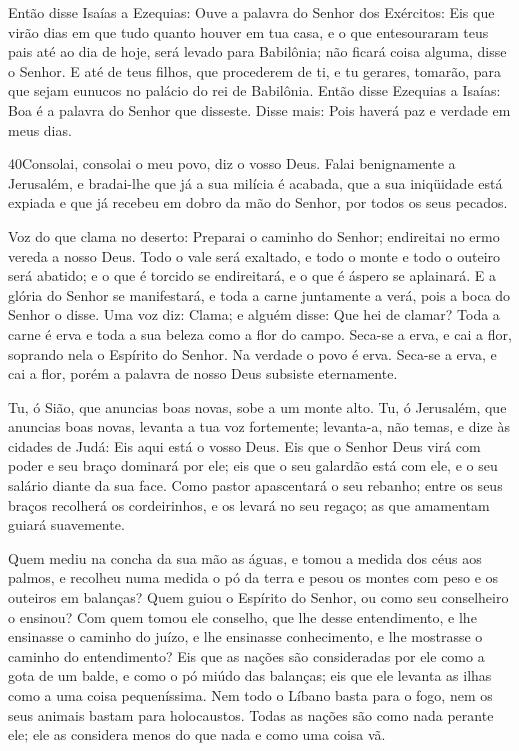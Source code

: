 Então disse Isaías a Ezequias: Ouve a palavra do Senhor dos
Exércitos: Eis que virão dias em que tudo quanto houver em tua
casa, e o que entesouraram teus pais até ao dia de hoje, será levado
para Babilônia; não ficará coisa alguma, disse o Senhor. E até
de teus filhos, que procederem de ti, e tu gerares, tomarão, para
que sejam eunucos no palácio do rei de Babilônia. Então disse
Ezequias a Isaías: Boa é a palavra do Senhor que disseste. Disse
mais: Pois haverá paz e verdade em meus dias.

\medskip

\lettrine{40}{}Consolai, consolai o meu povo, diz o vosso Deus.
Falai benignamente a Jerusalém, e bradai-lhe que já a sua
milícia é acabada, que a sua iniqüidade está expiada e que já
recebeu em dobro da mão do Senhor, por todos os seus pecados.

Voz do que clama no deserto: Preparai o caminho do Senhor;
endireitai no ermo vereda a nosso Deus. Todo o vale será
exaltado, e todo o monte e todo o outeiro será abatido; e o que é
torcido se endireitará, e o que é áspero se aplainará. E a
glória do Senhor se manifestará, e toda a carne juntamente a verá,
pois a boca do Senhor o disse. Uma voz diz: Clama; e alguém
disse: Que hei de clamar? Toda a carne é erva e toda a sua beleza
como a flor do campo. Seca-se a erva, e cai a flor, soprando
nela o Espírito do Senhor. Na verdade o povo é erva. Seca-se a
erva, e cai a flor, porém a palavra de nosso Deus subsiste
eternamente.

Tu, ó Sião, que anuncias boas novas, sobe a um monte alto. Tu, ó
Jerusalém, que anuncias boas novas, levanta a tua voz fortemente;
levanta-a, não temas, e dize às cidades de Judá: Eis aqui está o
vosso Deus. Eis que o Senhor Deus virá com poder e seu braço
dominará por ele; eis que o seu galardão está com ele, e o seu
salário diante da sua face. Como pastor apascentará o seu
rebanho; entre os seus braços recolherá os cordeirinhos, e os levará
no seu regaço; as que amamentam guiará suavemente.

Quem mediu na concha da sua mão as águas, e tomou a medida dos
céus aos palmos, e recolheu numa medida o pó da terra e pesou os
montes com peso e os outeiros em balanças? Quem guiou o
Espírito do Senhor, ou como seu conselheiro o ensinou? Com
quem tomou ele conselho, que lhe desse entendimento, e lhe ensinasse
o caminho do juízo, e lhe ensinasse conhecimento, e lhe mostrasse o
caminho do entendimento? Eis que as nações são consideradas
por ele como a gota de um balde, e como o pó miúdo das balanças; eis
que ele levanta as ilhas como a uma coisa pequeníssima. Nem
todo o Líbano basta para o fogo, nem os seus animais bastam para
holocaustos. Todas as nações são como nada perante ele; ele
as considera menos do que nada e como uma coisa vã.

